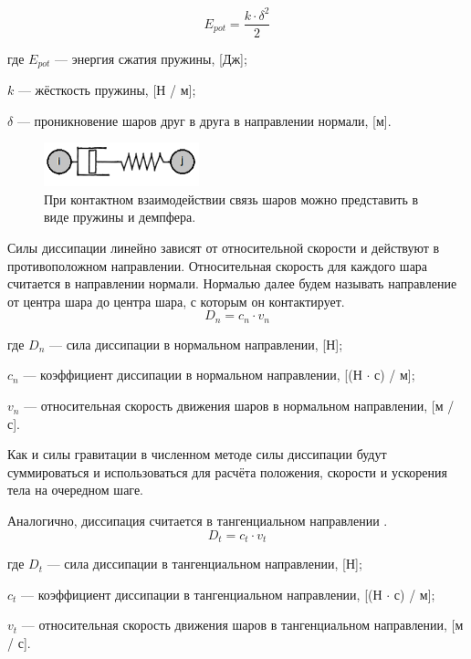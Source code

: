 \documentclass[utf8x, 14pt, oneside, a4paper]{article}
\begin{document}
\begin{equation}
\label{eq:pot_energy}
E_{pot} = \dfrac{k \cdot \delta^2}{2}
\end{equation}


где $E_{pot}$ --- энергия сжатия пружины, [Дж];

$k$ --- жёсткость пружины, [Н / м];

$\delta$ --- проникновение шаров друг в друга в направлении нормали, [м].

\begin{figure}[H]
	\centering
	\includegraphics[width=0.4\textwidth]{dempf}
	\caption{При контактном взаимодействии связь шаров можно представить в виде пружины и демпфера.}
	\label{pic:dempf}
\end{figure} 

Силы диссипации линейно зависят от относительной скорости и действуют в противоположном направлении.
Относительная скорость для каждого шара считается в направлении нормали.
Нормалью  далее будем называть направление от центра шара до центра шара, с которым он контактирует.
\begin{equation}
\label{dempf_force}
D_n = c_n \cdot v_n
\end{equation}

где $D_n$ --- сила диссипации в нормальном направлении, [Н];

$c_n$ --- коэффициент диссипации в нормальном направлении, [(Н $\cdot$ с) / м];

$v_n$ --- относительная скорость движения шаров в нормальном направлении, [м / с].

Как и силы гравитации в численном методе силы диссипации будут суммироваться и использоваться для расчёта положения, скорости и ускорения тела на очередном шаге.

Аналогично, диссипация считается в тангенциальном направлении \cite{many_pruzhina}.
\begin{equation}
\label{dempf_force_tangent}
D_t = c_t \cdot v_t
\end{equation}

где $D_t$ --- сила диссипации в тангенциальном направлении, [Н];

$c_t$ --- коэффициент диссипации в тангенциальном направлении, [(Н $\cdot$ с) / м];

$v_t$ --- относительная скорость движения шаров в тангенциальном направлении, [м / с].
\end{document}
